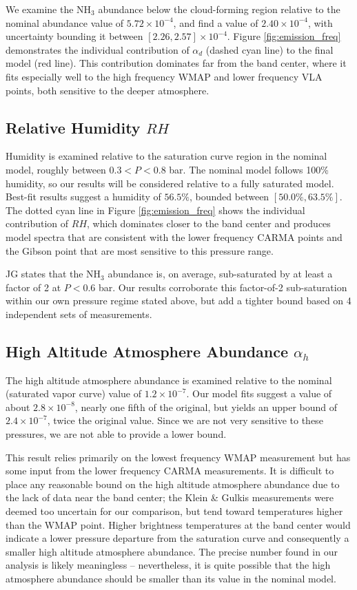 \documentclass{article}
\newcommand{\e}[1]{\times 10^{#1}}
\begin{document}
	We examine the NH$_{3}$ abundance below the cloud-forming region relative to the nominal abundance value of $5.72\e{-4}$, and find 
	a value of $2.40\e{-4}$, with uncertainty bounding it between $[2.26, 2.57] \e{-4}$.
	Figure \ref{fig:emission_freq} demonstrates the individual contribution of $\alpha_{d}$ (dashed cyan line) to the final model (red line).
	This contribution dominates far from the band center, where it fits especially well to the high frequency WMAP and lower frequency VLA points, both sensitive to the deeper atmosphere.


\subsection{Relative Humidity $RH$}

	Humidity is examined relative to the saturation curve region in the nominal model, roughly between $0.3 < P < 0.8$ bar.
	The nominal model follows 100\% humidity, so our results will be considered relative to a fully saturated model.
	Best-fit results suggest a humidity of $56.5\%$, bounded between $[50.0\%, 63.5\%]$.
	The dotted cyan line in Figure \ref{fig:emission_freq} shows the individual contribution of $RH$, which dominates closer to the band center and produces model spectra that are consistent with the lower frequency CARMA points and the Gibson point that are most sensitive to this pressure range.

	JG states that the NH$_{3}$ abundance is, on average, sub-saturated by at least a factor of 2 at $P < 0.6$ bar.
	Our results corroborate this  factor-of-2 sub-saturation  within our own pressure regime stated above, but add a tighter bound based on 4 independent sets of measurements.


\subsection{High Altitude Atmosphere Abundance $\alpha_{h}$}

	The high altitude atmosphere abundance is examined relative to the nominal (saturated vapor curve) value of $1.2\e{-7}$.
	Our model fits suggest a value of about $2.8\e{-8}$, nearly one fifth of the original, but yields an upper bound of $2.4\e{-7}$, twice the original value.
	Since we are not very sensitive to these pressures, we are not able to provide a lower bound.

	This result relies primarily on the lowest frequency WMAP measurement but has some input from the lower frequency CARMA measurements.
	It is difficult to place any reasonable bound on the high altitude atmosphere abundance due to the lack of data near the band center; the Klein \& Gulkis measurements were deemed too uncertain for our comparison, but tend toward temperatures higher than the WMAP point.
	Higher brightness temperatures at the band center would indicate a lower pressure departure from the saturation curve and consequently a smaller high altitude atmosphere abundance.
	The precise number found in our analysis is likely meaningless -- nevertheless, it is quite possible that the high atmosphere abundance should be smaller than its value in the nominal model.
	
\end{document}
